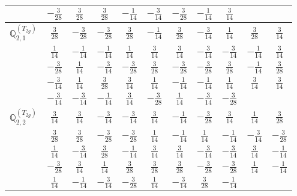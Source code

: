 \documentclass[fleqn,10pt,landscape]{article}
\begin{document}
\begin{itemize}
{\begin{center}
\begin{longtable}{ccccccccccc}
& $ - \frac{3}{28} $ & $ \frac{3}{28} $ & $ \frac{3}{28} $ & $ - \frac{1}{14} $ & $ - \frac{3}{14} $ & $ - \frac{3}{28} $ & $ - \frac{1}{14} $ & $ \frac{3}{14} $ & $  $ & $  $ \\ \hline
$\mathbb{Q}_{2,1}^{(T_{2g})}$ & $ \frac{3}{28} $ & $ - \frac{3}{28} $ & $ - \frac{3}{28} $ & $ \frac{3}{28} $ & $ - \frac{1}{14} $ & $ \frac{3}{28} $ & $ - \frac{3}{14} $ & $ \frac{1}{14} $ & $ \frac{3}{28} $ & $ \frac{3}{14} $ \\
& $ \frac{1}{14} $ & $ - \frac{1}{14} $ & $ - \frac{1}{14} $ & $ \frac{1}{14} $ & $ \frac{3}{14} $ & $ \frac{3}{14} $ & $ - \frac{3}{14} $ & $ - \frac{3}{14} $ & $ - \frac{1}{14} $ & $ \frac{3}{14} $ \\
& $ - \frac{3}{28} $ & $ \frac{1}{14} $ & $ - \frac{3}{14} $ & $ - \frac{3}{28} $ & $ \frac{3}{28} $ & $ - \frac{3}{28} $ & $ - \frac{3}{28} $ & $ \frac{3}{28} $ & $ - \frac{1}{14} $ & $ \frac{3}{28} $ \\
& $ - \frac{3}{14} $ & $ \frac{1}{14} $ & $ \frac{3}{28} $ & $ \frac{3}{14} $ & $ \frac{1}{14} $ & $ - \frac{1}{14} $ & $ - \frac{1}{14} $ & $ \frac{1}{14} $ & $ \frac{3}{14} $ & $ \frac{3}{14} $ \\
& $ - \frac{3}{14} $ & $ - \frac{3}{14} $ & $ - \frac{1}{14} $ & $ \frac{3}{14} $ & $ - \frac{3}{28} $ & $ \frac{1}{14} $ & $ - \frac{3}{14} $ & $ - \frac{3}{28} $ & $  $ & $  $ \\ \hline
$\mathbb{Q}_{2,2}^{(T_{2g})}$ & $ \frac{3}{14} $ & $ \frac{3}{14} $ & $ - \frac{3}{14} $ & $ - \frac{3}{14} $ & $ \frac{3}{14} $ & $ - \frac{1}{14} $ & $ - \frac{3}{28} $ & $ \frac{3}{14} $ & $ \frac{1}{14} $ & $ \frac{3}{28} $ \\
& $ \frac{3}{28} $ & $ \frac{3}{28} $ & $ - \frac{3}{28} $ & $ - \frac{3}{28} $ & $ \frac{1}{14} $ & $ - \frac{1}{14} $ & $ \frac{1}{14} $ & $ - \frac{1}{14} $ & $ - \frac{3}{14} $ & $ - \frac{3}{28} $ \\
& $ \frac{1}{14} $ & $ - \frac{3}{14} $ & $ \frac{3}{28} $ & $ - \frac{1}{14} $ & $ \frac{3}{14} $ & $ \frac{3}{14} $ & $ - \frac{3}{14} $ & $ - \frac{3}{14} $ & $ \frac{3}{14} $ & $ - \frac{1}{14} $ \\
& $ - \frac{3}{28} $ & $ \frac{3}{14} $ & $ \frac{1}{14} $ & $ \frac{3}{28} $ & $ \frac{3}{28} $ & $ \frac{3}{28} $ & $ - \frac{3}{28} $ & $ - \frac{3}{28} $ & $ \frac{1}{14} $ & $ - \frac{1}{14} $ \\
& $ \frac{1}{14} $ & $ - \frac{1}{14} $ & $ - \frac{3}{14} $ & $ - \frac{3}{28} $ & $ \frac{1}{14} $ & $ - \frac{3}{14} $ & $ \frac{3}{28} $ & $ - \frac{1}{14} $ & $  $ & $  $ \\ \hline

\end{longtable}
\end{center}}
\end{itemize}
\end{document}

